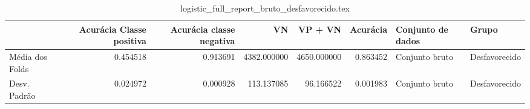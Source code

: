 \begin{table}
\centering
\caption{logistic_full_report_bruto_desfavorecido.tex}
\label{logistic_full_report_bruto_desfavorecido.tex}
\begin{tabular}{lrrrrrll}
\toprule
{}               &  Acurácia Classe positiva &  Acurácia classe negativa &          VN  &     VP + VN  &  Acurácia & Conjunto de dados &          Grupo \\
\midrule
Média dos Folds &                  0.454518 &                  0.913691 &  4382.000000 &  4650.000000 &  0.863452 &    Conjunto bruto &  Desfavorecido \\
Desv. Padrão    &                  0.024972 &                  0.000928 &   113.137085 &    96.166522 &  0.001983 &    Conjunto bruto &  Desfavorecido \\
\bottomrule
\end{tabular}
\end{table}
